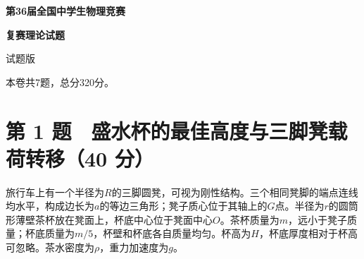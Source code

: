 \documentclass[12pt,a4paper,fontset=fandol]{ctexart}
\begin{document}
\begin{titlepage}
\thispagestyle{empty}
\vspace*{27mm}
\begin{center}
{\LARGE\bfseries 第36届全国中学生物理竞赛\par}
\vspace{8mm}
{\LARGE\bfseries 复赛理论试题\par}
\vspace{17mm}
{\Large 试题版\par}
\end{center}
\vfill
\end{titlepage}
\setcounter{page}{1}
本卷共7题，总分320分。

\section{第 1 题　盛水杯的最佳高度与三脚凳载荷转移（40
分）}\label{ux7b2c-1-ux9898-ux76dbux6c34ux676fux7684ux6700ux4f73ux9ad8ux5ea6ux4e0eux4e09ux811aux51f3ux8f7dux8377ux8f6cux79fb40-ux5206}

旅行车上有一个半径为\(R\)的三脚圆凳，可视为刚性结构。三个相同凳脚的端点连线均水平，构成边长为\(a\)的等边三角形；凳子质心位于其轴上的\(G\)点。半径为\(r\)的圆筒形薄壁茶杯放在凳面上，杯底中心位于凳面中心\(O\)。茶杯质量为\(m\)，远小于凳子质量；杯底质量为\(m/5\)，杯壁和杯底各自质量均匀。杯高为\(H\)，杯底厚度相对于杯高可忽略。茶水密度为\(\rho\)，重力加速度为\(g\)。
\end{document}
